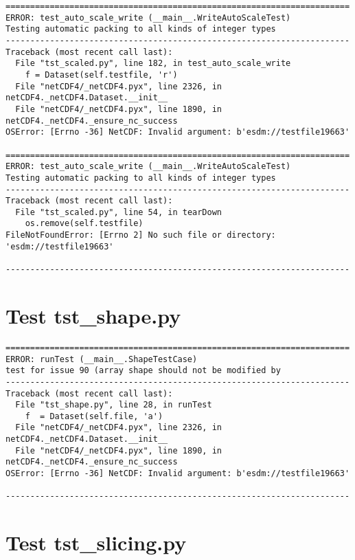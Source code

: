 \begin{verbatim}
======================================================================
ERROR: test_auto_scale_write (__main__.WriteAutoScaleTest)
Testing automatic packing to all kinds of integer types
----------------------------------------------------------------------
Traceback (most recent call last):
  File "tst_scaled.py", line 182, in test_auto_scale_write
    f = Dataset(self.testfile, 'r')
  File "netCDF4/_netCDF4.pyx", line 2326, in netCDF4._netCDF4.Dataset.__init__
  File "netCDF4/_netCDF4.pyx", line 1890, in netCDF4._netCDF4._ensure_nc_success
OSError: [Errno -36] NetCDF: Invalid argument: b'esdm://testfile19663'

======================================================================
ERROR: test_auto_scale_write (__main__.WriteAutoScaleTest)
Testing automatic packing to all kinds of integer types
----------------------------------------------------------------------
Traceback (most recent call last):
  File "tst_scaled.py", line 54, in tearDown
    os.remove(self.testfile)
FileNotFoundError: [Errno 2] No such file or directory: 'esdm://testfile19663'

----------------------------------------------------------------------
\end{verbatim}

\section{Test tst\_shape.py}

\begin{verbatim}
======================================================================
ERROR: runTest (__main__.ShapeTestCase)
test for issue 90 (array shape should not be modified by
----------------------------------------------------------------------
Traceback (most recent call last):
  File "tst_shape.py", line 28, in runTest
    f  = Dataset(self.file, 'a')
  File "netCDF4/_netCDF4.pyx", line 2326, in netCDF4._netCDF4.Dataset.__init__
  File "netCDF4/_netCDF4.pyx", line 1890, in netCDF4._netCDF4._ensure_nc_success
OSError: [Errno -36] NetCDF: Invalid argument: b'esdm://testfile19663'

----------------------------------------------------------------------
\end{verbatim}

\section{Test tst\_slicing.py}

